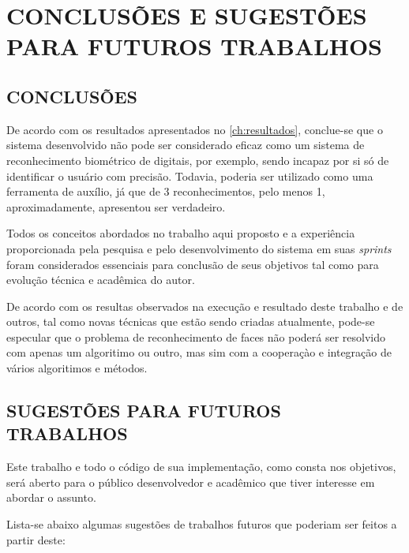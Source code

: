 
\chapter{CONCLUSÕES E SUGESTÕES PARA FUTUROS TRABALHOS}\label{ch:conclusao}
\section{CONCLUSÕES} 

De acordo com os resultados apresentados no \autoref{ch:resultados}, conclue-se que o sistema desenvolvido não pode ser considerado eficaz como um sistema de reconhecimento biométrico de digitais, por exemplo, sendo incapaz por si só de identificar o usuário com precisão. Todavia, poderia ser utilizado como uma ferramenta de auxílio, já que de 3 reconhecimentos, pelo menos 1, aproximadamente, apresentou ser verdadeiro.

Todos os conceitos abordados no trabalho aqui proposto e a experiência proporcionada pela pesquisa e pelo desenvolvimento do sistema em suas \textit{sprints} foram considerados essenciais para conclusão de seus objetivos tal como para evolução técnica e acadêmica do autor. 

De acordo com os resultas observados na execução e resultado deste trabalho e de outros, tal como novas técnicas que estão sendo criadas atualmente, pode-se especular que o problema de reconhecimento de faces não poderá ser resolvido com apenas um algoritimo ou outro, mas sim com a cooperaçào e integração de vários algoritimos e métodos.


\section{SUGESTÕES PARA FUTUROS TRABALHOS}


Este trabalho e todo o código de sua implementação, como consta nos objetivos, será aberto para o público desenvolvedor e acadêmico que tiver interesse em abordar o assunto. 

Lista-se abaixo algumas sugestões de trabalhos futuros que poderiam ser feitos a partir deste:


